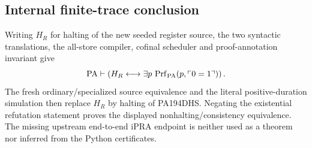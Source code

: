 \subsection{Internal finite-trace conclusion}

Writing $H_R$ for halting of the new seeded register source, the two
syntactic translations, the all-store compiler, cofinal scheduler and
proof-annotation invariant give
\[
 \mathrm{PA}\vdash\left(H_R\longleftrightarrow
       \exists p\,\operatorname{Prf}_{\mathrm{PA}}(p,\ulcorner0=1\urcorner)\right).
\]
The fresh ordinary/specialized source equivalence and the literal
positive-duration simulation then replace $H_R$ by halting of PA194DHS.
Negating the existential refutation statement proves the displayed
nonhalting/consistency equivalence. The missing upstream end-to-end
iPRA endpoint is neither used as a theorem nor inferred from the Python
certificates.
